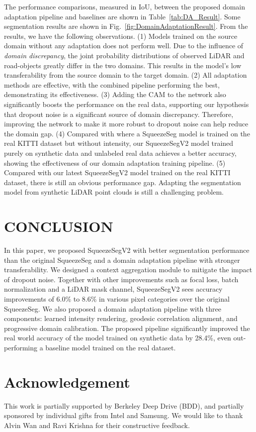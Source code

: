 \documentclass[letterpaper, 10 pt, conference]{ieeeconf}
\begin{document}
The performance comparisons, measured in IoU, between the proposed domain adaptation pipeline and baselines  are shown in Table~\ref{tab:DA_Result}. Some segmentation results are shown in Fig.~\ref{fig:DomainAdaptationResult}. From the results, we have the following observations. (1) Models trained on the source domain without any adaptation does not perform well. Due to the influence of \emph{domain discrepancy}, the joint probability distributions of observed LiDAR and road-objects greatly differ in the two domains. This results in the model's low transferability from the source domain to the target domain. (2) All adaptation methods are effective, with the combined pipeline performing the best, demonstrating its effectiveness. (3) Adding the CAM to the network also significantly boosts the performance on the real data, supporting our hypothesis that dropout noise is a significant source of domain discrepancy. Therefore, improving the network to make it more robust to dropout noise can help reduce the domain gap. (4) Compared with \cite{wu2017squeezeseg} where a SqueezeSeg model is trained on the real KITTI dataset but without intensity, our SqueezeSegV2 model trained purely on synthetic data and unlabeled real data achieves a better accuracy, showing the effectiveness of our domain adaptation training pipeline. (5) Compared with our latest SqueezeSegV2 model trained on the real KITTI dataset, there is still an obvious performance gap. Adapting the segmentation model from synthetic LiDAR point clouds is still a challenging problem.

\section{CONCLUSION}
\label{sec:Conclusion}
In this paper, we proposed SqueezeSegV2 with better segmentation performance than the original SqueezeSeg and a domain adaptation pipeline with stronger transferability. We designed a context aggregation module to mitigate the impact of dropout noise. Together with other improvements such as focal loss, batch normalization and a LiDAR mask channel, SqueezeSegV2 sees accuracy improvements of 6.0\% to 8.6\% in various pixel categories over the original SqueezeSeg. We also proposed a domain adaptation pipeline with three components: learned intensity rendering, geodesic correlation alignment, and progressive domain calibration. The proposed pipeline significantly improved the real world accuracy of the model trained on synthetic data by 28.4\%, even out-performing a baseline model \cite{wu2017squeezeseg} trained on the real dataset.

\section*{Acknowledgement}
This work is partially supported by Berkeley Deep Drive (BDD), and partially sponsored by individual gifts from Intel and Samsung. We would like to thank Alvin Wan and Ravi Krishna for their constructive feedback.


\addtolength{\textheight}{-8cm}   








\newpage
\small

\end{document}

